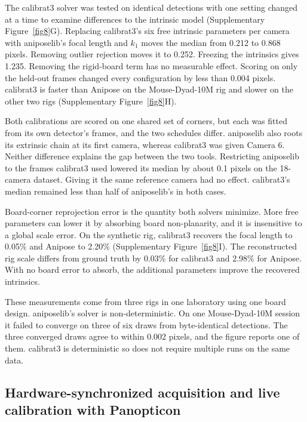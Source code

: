\documentclass[pdflatex, sn-nature]{sn-jnl}
\theoremstyle{thmstyleone}%
\theoremstyle{thmstyletwo}%
\theoremstyle{thmstylethree}%
\begin{document}
The calibrat3 solver was tested on identical detections with one setting changed at a time to examine differences to the intrinsic model (Supplementary Figure~\ref{fig8}G). Replacing calibrat3's six free intrinsic parameters per camera with aniposelib's focal length and $k_1$ moves the median from 0.212 to 0.868 pixels. Removing outlier rejection moves it to 0.252. Freezing the intrinsics gives 1.235. Removing the rigid-board term has no measurable effect. Scoring on only the held-out frames changed every configuration by less than 0.004 pixels. calibrat3 is faster than Anipose on the Mouse-Dyad-10M rig and slower on the other two rigs (Supplementary Figure~\ref{fig8}H).

Both calibrations are scored on one shared set of corners, but each was fitted from its own detector's frames, and the two schedules differ. aniposelib also roots its extrinsic chain at its first camera, whereas calibrat3 was given Camera 6. Neither difference explains the gap between the two tools. Restricting aniposelib to the frames calibrat3 used lowered its median by about 0.1 pixels on the 18-camera dataset. Giving it the same reference camera had no effect. calibrat3's median remained less than half of aniposelib's in both cases.

Board-corner reprojection error is the quantity both solvers minimize. More free parameters can lower it by absorbing board non-planarity, and it is insensitive to a global scale error. On the synthetic rig, calibrat3 recovers the focal length to 0.05\% and Anipose to 2.20\% (Supplementary Figure~\ref{fig8}I). The reconstructed rig scale differs from ground truth by 0.03\% for calibrat3 and 2.98\% for Anipose. With no board error to absorb, the additional parameters improve the recovered intrinsics.

These measurements come from three rigs in one laboratory using one board design. aniposelib's solver is non-deterministic. On one Mouse-Dyad-10M session it failed to converge on three of six draws from byte-identical detections. The three converged draws agree to within 0.002 pixels, and the figure reports one of them. calibrat3 is deterministic so does not require multiple runs on the same data.

\subsection{Hardware-synchronized acquisition and live calibration with Panopticon}\label{subsec-panopticon}
\end{document}
